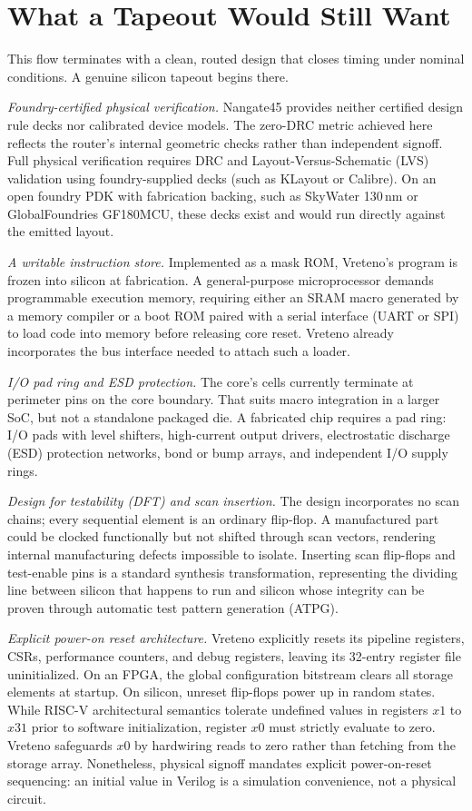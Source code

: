 \documentclass[journal,9pt]{IEEEtran}
\begin{document}
\section{What a Tapeout Would Still Want}
\label{sec:t-not}

This flow terminates with a clean, routed design that closes timing
under nominal conditions. A genuine silicon tapeout begins there.

\emph{Foundry-certified physical verification.} Nangate45 provides
neither certified design rule decks nor calibrated device models. The
zero-DRC metric achieved here reflects the router's internal geometric
checks rather than independent signoff. Full physical verification
requires DRC and Layout-Versus-Schematic (LVS) validation using
foundry-supplied decks (such as KLayout or Calibre). On an open foundry
PDK with fabrication backing, such as SkyWater 130\,nm or
GlobalFoundries GF180MCU, these decks exist and would run directly
against the emitted layout.

\emph{A writable instruction store.} Implemented as a mask ROM,
Vreteno's program is frozen into silicon at fabrication. A general-purpose
microprocessor demands programmable execution memory, requiring either
an SRAM macro generated by a memory compiler or a boot ROM paired with a
serial interface (UART or SPI) to load code into memory before releasing
core reset. Vreteno already incorporates the bus interface needed to
attach such a loader.

\emph{I/O pad ring and ESD protection.} The core's \asiccells{} cells
currently terminate at perimeter pins on the core boundary. That suits
macro integration in a larger SoC, but not a standalone packaged
die. A fabricated chip requires a pad ring: I/O pads with
level shifters, high-current output drivers, electrostatic discharge
(ESD) protection networks, bond or bump arrays, and independent I/O
supply rings.

\emph{Design for testability (DFT) and scan insertion.} The design
incorporates no scan chains; every sequential element is an ordinary
flip-flop. A manufactured part could be clocked functionally but not
shifted through scan vectors, rendering internal manufacturing defects
impossible to isolate. Inserting scan flip-flops and test-enable pins
is a standard synthesis transformation, representing the dividing line
between silicon that happens to run and silicon whose integrity can be
proven through automatic test pattern generation (ATPG).

\emph{Explicit power-on reset architecture.} Vreteno explicitly resets
its pipeline registers, CSRs, performance counters, and debug registers,
leaving its 32-entry register file uninitialized. On an FPGA, the
global configuration bitstream clears all storage elements at startup.
On silicon, unreset flip-flops power up in random states. While RISC-V
architectural semantics tolerate undefined values in registers
$x1$ to $x31$ prior to software initialization, register $x0$ must
strictly evaluate to zero. Vreteno safeguards $x0$ by hardwiring reads
to zero rather than fetching from the storage array. Nonetheless,
physical signoff mandates explicit power-on-reset sequencing: an initial
value in Verilog is a simulation convenience, not a physical circuit.
\end{document}
